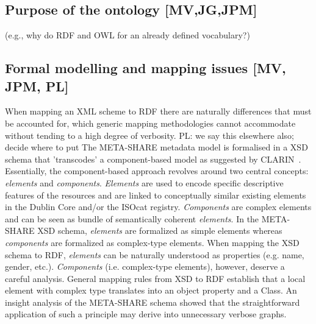 \documentclass{llncs}
\begin{document}
\subsection{Purpose of the ontology [MV,JG,JPM]}
\label{sec:purpose}
(e.g., why do RDF and OWL for an already defined vocabulary?)
\subsection{Formal modelling and mapping issues [MV, JPM, PL]}
When mapping an XML scheme to RDF there are naturally differences that must be
accounted for, which generic mapping methodologies cannot accommodate without
tending to a high degree of verbosity.
{PL: we say this elsewhere also; decide where to put}
The META-SHARE metadata model is formalised in a XSD schema that 'transcodes' a component-based model as suggested by CLARIN~\cite{broeder2012cmdi}. Essentially, the component-based approach revolves around two central concepts: \emph{elements} and \emph{components}. \emph{Elements} are used to encode specific descriptive features of the resources and are linked to conceptually similar existing elements in the Dublin Core and/or the ISOcat registry. \emph{Components} are complex elements and can be seen as bundle of semantically coherent \emph{elements}.
In the META-SHARE XSD schema, \emph{elements} are formalized as simple elements whereas \emph{components} are formalized as complex-type elements. When mapping the XSD schema to RDF, \emph{elements} can be naturally understood as properties (e.g. name, gender, etc.). \emph{Components} (i.e. complex-type elements), however, deserve a careful analysis. General mapping rules from XSD to RDF establish that a local element with complex type translates into an object property and a Class. An insight analysis of the META-SHARE schema showed that the straightforward application of such a principle may derive into unnecessary verbose graphs.
\end{document}
